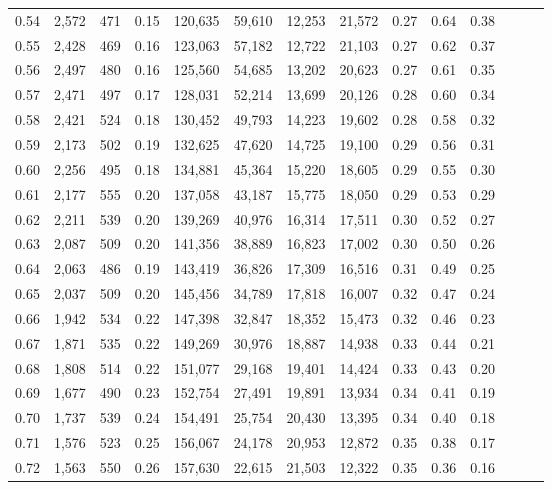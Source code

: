\begin{tabular}{rrrrrrrrrrrrrr}
0.54 &  2,572 &    471 &  0.15 &  120,635 &   59,610 &  12,253 &  21,572 &  0.27 &  0.64 &      0.38 \\
0.55 &  2,428 &    469 &  0.16 &  123,063 &   57,182 &  12,722 &  21,103 &  0.27 &  0.62 &      0.37 \\
0.56 &  2,497 &    480 &  0.16 &  125,560 &   54,685 &  13,202 &  20,623 &  0.27 &  0.61 &      0.35 \\
0.57 &  2,471 &    497 &  0.17 &  128,031 &   52,214 &  13,699 &  20,126 &  0.28 &  0.60 &      0.34 \\
0.58 &  2,421 &    524 &  0.18 &  130,452 &   49,793 &  14,223 &  19,602 &  0.28 &  0.58 &      0.32 \\
0.59 &  2,173 &    502 &  0.19 &  132,625 &   47,620 &  14,725 &  19,100 &  0.29 &  0.56 &      0.31 \\
0.60 &  2,256 &    495 &  0.18 &  134,881 &   45,364 &  15,220 &  18,605 &  0.29 &  0.55 &      0.30 \\
0.61 &  2,177 &    555 &  0.20 &  137,058 &   43,187 &  15,775 &  18,050 &  0.29 &  0.53 &      0.29 \\
0.62 &  2,211 &    539 &  0.20 &  139,269 &   40,976 &  16,314 &  17,511 &  0.30 &  0.52 &      0.27 \\
0.63 &  2,087 &    509 &  0.20 &  141,356 &   38,889 &  16,823 &  17,002 &  0.30 &  0.50 &      0.26 \\
0.64 &  2,063 &    486 &  0.19 &  143,419 &   36,826 &  17,309 &  16,516 &  0.31 &  0.49 &      0.25 \\
0.65 &  2,037 &    509 &  0.20 &  145,456 &   34,789 &  17,818 &  16,007 &  0.32 &  0.47 &      0.24 \\
0.66 &  1,942 &    534 &  0.22 &  147,398 &   32,847 &  18,352 &  15,473 &  0.32 &  0.46 &      0.23 \\
0.67 &  1,871 &    535 &  0.22 &  149,269 &   30,976 &  18,887 &  14,938 &  0.33 &  0.44 &      0.21 \\
0.68 &  1,808 &    514 &  0.22 &  151,077 &   29,168 &  19,401 &  14,424 &  0.33 &  0.43 &      0.20 \\
0.69 &  1,677 &    490 &  0.23 &  152,754 &   27,491 &  19,891 &  13,934 &  0.34 &  0.41 &      0.19 \\
0.70 &  1,737 &    539 &  0.24 &  154,491 &   25,754 &  20,430 &  13,395 &  0.34 &  0.40 &      0.18 \\
0.71 &  1,576 &    523 &  0.25 &  156,067 &   24,178 &  20,953 &  12,872 &  0.35 &  0.38 &      0.17 \\
0.72 &  1,563 &    550 &  0.26 &  157,630 &   22,615 &  21,503 &  12,322 &  0.35 &  0.36 &      0.16 \\

\end{tabular}
